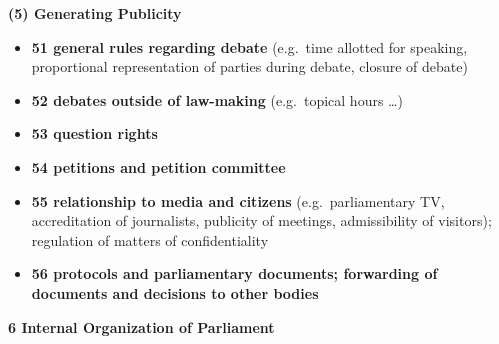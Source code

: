\documentclass[]{article}
\providecommand{\tightlist}{%
  \setlength{\itemsep}{0pt}\setlength{\parskip}{0pt}}
\begin{document}
\textbf{(5) Generating Publicity}

\begin{itemize}
\tightlist
\item
  \textbf{51 general rules regarding debate} (e.g.~time allotted for
  speaking, proportional representation of parties during debate,
  closure of debate)
\item
  \textbf{52 debates outside of law-making} (e.g.~topical hours
  \ldots{})
\item
  \textbf{53 question rights}
\item
  \textbf{54 petitions and petition committee}
\item
  \textbf{55 relationship to media and citizens} (e.g.~parliamentary TV,
  accreditation of journalists, publicity of meetings, admissibility of
  visitors); regulation of matters of confidentiality
\item
  \textbf{56 protocols and parliamentary documents; forwarding of
  documents and decisions to other bodies}
\end{itemize}

\textbf{6 Internal Organization of Parliament}
\end{document}
